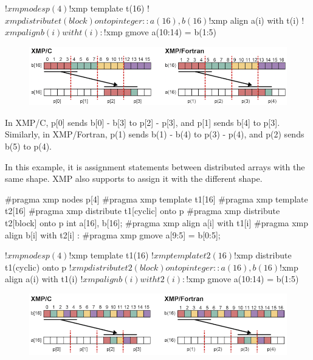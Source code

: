 \begin{XFexample}
!$xmp nodes p(4)
!$xmp template t(16)
!$xmp distribute t(block) onto p
integer :: a(16), b(16)
!$xmp align a(i) with t(i)
!$xmp align b(i) with t(i)
     :
!$xmp gmove
  a(10:14) = b(1:5)
\end{XFexample}

\begin{figure}
  \centering
  \includegraphics{figs/gmove.png}
\end{figure}

In XMP/C, p[0] sends b[0] - b[3] to p[2] - p[3], and p[1] sends b[4] to
p[3]. Similarly, in XMP/Fortran, p(1) sends b(1) - b(4) to p(3) - p(4),
and p(2) sends b(5) to p(4).

In this example, it is assignment statements between distributed arrays
with the same shape. XMP also supports to assign it with the different
shape.

\begin{XCexample}
#pragma xmp nodes p[4]
#pragma xmp template t1[16]
#pragma xmp template t2[16]
#pragma xmp distribute t1[cyclic] onto p
#pragma xmp distribute t2[block] onto p
int a[16], b[16];
#pragma xmp align a[i] with t1[i]
#pragma xmp align b[i] with t2[i]
     :
#pragma xmp gmove
  a[9:5] = b[0:5];
\end{XCexample}

\begin{XFexample}
!$xmp nodes p(4)
!$xmp template t1(16)
!$xmp template t2(16)
!$xmp distribute t1(cyclic) onto p
!$xmp distribute t2(block) onto p
integer :: a(16), b(16)
!$xmp align a(i) with t1(i)
!$xmp align b(i) with t2(i)
     :
!$xmp gmove
  a(10:14) = b(1:5)
\end{XFexample}

\begin{figure}
  \centering
  \includegraphics{figs/gmove_cyclic.png}
\end{figure}

